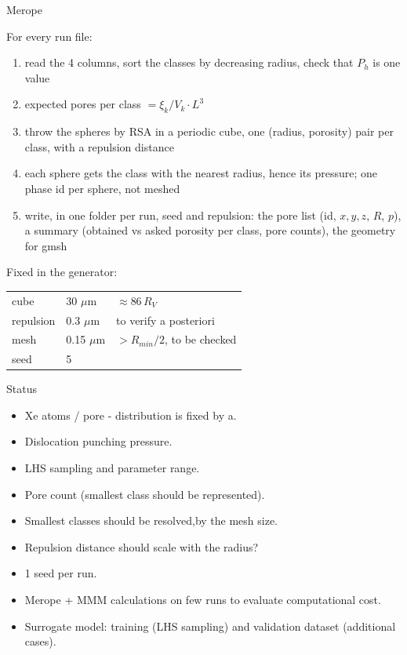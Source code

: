 \documentclass[10pt,aspectratio=169]{beamer}
\begin{document}
\begin{frame}{Merope}

For every run file:
\begin{enumerate}
\item read the 4 columns, sort the classes by decreasing radius, check that $P_h$ is one value
\item expected pores per class $=\xi_k/V_k\cdot L^3$
\item throw the spheres by RSA in a periodic cube, one (radius, porosity) pair per class, with a repulsion distance
\item each sphere gets the class with the nearest radius, hence its pressure; one phase id per sphere, not meshed
\item write, in one folder per run, seed and repulsion: the pore list (id, $x,y,z$, $R$, $p$), a summary (obtained vs asked porosity per class, pore counts), the geometry for gmsh
\end{enumerate}

\centering
Fixed in the generator:\\[2pt]
\begin{tabular}{@{}lll@{}}
\toprule
cube & 30 $\mu$m & $\approx86\,R_V$\\
repulsion & 0.3 $\mu$m & to verify a posteriori\\
mesh & 0.15 $\mu$m & $>R_{min}/2$, to be checked\\
seed & 5 & \\
\bottomrule
\end{tabular}

\end{frame}

\begin{frame}{Status}
\footnotesize
\begin{itemize}
\item Xe atoms / pore - distribution is fixed by a.
\item Dislocation punching pressure.
\item LHS sampling and parameter range.
\item Pore count (smallest class should be represented).
\item Smallest classes should be resolved,by the mesh size.
\item Repulsion distance should scale with the radius?
\item 1 seed per run.
\item Merope + MMM calculations on few runs to evaluate computational cost.
\item Surrogate model: training (LHS sampling) and validation dataset (additional cases). 
\end{itemize}
\end{frame}
\end{document}
